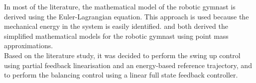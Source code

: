 In most of the literature, the mathematical model of the robotic gymnast is derived using the Euler-Lagrangian equation. This approach is used because the mechanical energy in the system is easily identified. \citet{derivation_controlPlaner} and \citet{tedrake} both derived the simplified mathematical models for the robotic gymnast using point mass approximations. \\

Based on the literature study, it was decided to perform the swing up control using partial feedback linearisation and an energy-based reference trajectory, and to perform the balancing control using a linear full state feedback controller.


